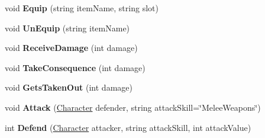 \begin{DoxyCompactItemize}
\item 
\hypertarget{class_dungeon_crawler_1_1_character_1_1_character_a60ed0daf6e2a281318dc35effe82566c}{}void {\bfseries Equip} (string item\+Name, string slot)\label{class_dungeon_crawler_1_1_character_1_1_character_a60ed0daf6e2a281318dc35effe82566c}

\item 
\hypertarget{class_dungeon_crawler_1_1_character_1_1_character_a625216059f7c3d1dfa61bd93ac32c8be}{}void {\bfseries Un\+Equip} (string item\+Name)\label{class_dungeon_crawler_1_1_character_1_1_character_a625216059f7c3d1dfa61bd93ac32c8be}

\item 
\hypertarget{class_dungeon_crawler_1_1_character_1_1_character_af4d0724811374b91bb6257b4fef2cb9a}{}void {\bfseries Receive\+Damage} (int damage)\label{class_dungeon_crawler_1_1_character_1_1_character_af4d0724811374b91bb6257b4fef2cb9a}

\item 
\hypertarget{class_dungeon_crawler_1_1_character_1_1_character_a6c2305e906fbcf5b7bd581c7f695318d}{}void {\bfseries Take\+Consequence} (int damage)\label{class_dungeon_crawler_1_1_character_1_1_character_a6c2305e906fbcf5b7bd581c7f695318d}

\item 
\hypertarget{class_dungeon_crawler_1_1_character_1_1_character_ace129083908dc966bce4cbae4c8048c9}{}void {\bfseries Gets\+Taken\+Out} (int damage)\label{class_dungeon_crawler_1_1_character_1_1_character_ace129083908dc966bce4cbae4c8048c9}

\item 
\hypertarget{class_dungeon_crawler_1_1_character_1_1_character_a30c222f247a9a27fb69d5cb3cb9f5b30}{}void {\bfseries Attack} (\hyperlink{class_dungeon_crawler_1_1_character_1_1_character}{Character} defender, string attack\+Skill=\char`\"{}Melee\+Weapons\char`\"{})\label{class_dungeon_crawler_1_1_character_1_1_character_a30c222f247a9a27fb69d5cb3cb9f5b30}

\item 
\hypertarget{class_dungeon_crawler_1_1_character_1_1_character_a0fae904150f11f772ee3d837afd0d9cc}{}int {\bfseries Defend} (\hyperlink{class_dungeon_crawler_1_1_character_1_1_character}{Character} attacker, string attack\+Skill, int attack\+Value)\label{class_dungeon_crawler_1_1_character_1_1_character_a0fae904150f11f772ee3d837afd0d9cc}

\end{DoxyCompactItemize}
